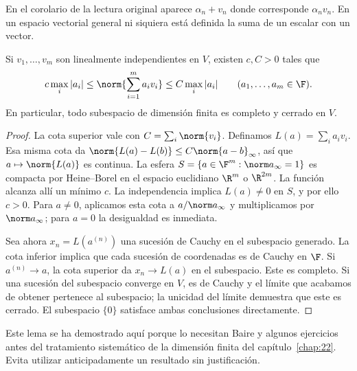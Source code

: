 \begin{observacion}
En el corolario de la lectura original aparece $\alpha_n+v_n$ donde corresponde $\alpha_nv_n$. En un espacio vectorial general ni siquiera está definida la suma de un escalar con un vector.
\end{observacion}

\begin{lema}\label{ch19:coordenadas}
Si $v_1,\ldots,v_m$ son linealmente independientes en $V$, existen $c,C>0$ tales que
\[
 c\max_i|a_i|\leq\norm{\sum_{i=1}^m a_iv_i}\leq C\max_i|a_i|
 \qquad(a_1,\ldots,a_m\in\F).
\]
En particular, todo subespacio de dimensión finita es completo y cerrado en $V$.
\end{lema}
\begin{proof}
La cota superior vale con $C=\sum_i\norm{v_i}$. Definamos $L(a)=\sum_i a_iv_i$. Esa misma cota da $\norm{L(a)-L(b)}\leq C\norm{a-b}_\infty$, así que $a\mapsto\norm{L(a)}$ es continua. La esfera $S=\{a\in\F^m:\norm a_\infty=1\}$ es compacta por Heine--Borel en el espacio euclidiano $\R^m$ o $\R^{2m}$. La función alcanza allí un mínimo $c$. La independencia implica $L(a)\ne0$ en $S$, y por ello $c>0$. Para $a\ne0$, aplicamos esta cota a $a/\norm a_\infty$ y multiplicamos por $\norm a_\infty$; para $a=0$ la desigualdad es inmediata.

Sea ahora $x_n=L(a^{(n)})$ una sucesión de Cauchy en el subespacio generado. La cota inferior implica que cada sucesión de coordenadas es de Cauchy en $\F$. Si $a^{(n)}\to a$, la cota superior da $x_n\to L(a)$ en el subespacio. Este es completo. Si una sucesión del subespacio converge en $V$, es de Cauchy y el límite que acabamos de obtener pertenece al subespacio; la unicidad del límite demuestra que este es cerrado. El subespacio $\{0\}$ satisface ambas conclusiones directamente.
\end{proof}

Este lema se ha demostrado aquí porque lo necesitan Baire y algunos ejercicios antes del tratamiento sistemático de la dimensión finita del capítulo~\ref{chap:22}. Evita utilizar anticipadamente un resultado sin justificación.


